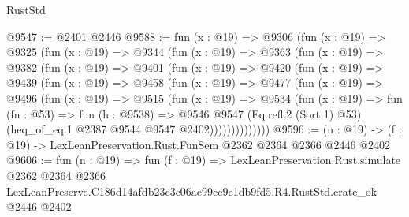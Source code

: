 \begin{lexlean}{RustStd}
\begin{coremodule}
@9547 := @2401 @2446
@9588 := fun (x : @19) =>
  @9306
    (fun (x : @19) =>
    @9325
      (fun (x : @19) =>
      @9344
        (fun (x : @19) =>
        @9363
          (fun (x : @19) =>
          @9382
            (fun (x : @19) =>
            @9401
              (fun (x : @19) =>
              @9420
                (fun (x : @19) =>
                @9439
                  (fun (x : @19) =>
                  @9458
                    (fun (x : @19) =>
                    @9477
                      (fun (x : @19) =>
                      @9496
                        (fun (x : @19) =>
                        @9515
                          (fun (x : @19) =>
                          @9534
                            (fun (x : @19) =>
                            fun (fn : @53) =>
                            fun (h : @9538) =>
                            @9546
                              @9547
                              (Eq.refl.{2} (Sort 1) @53)
                              (heq_of_eq.{1} @2387 @9544 @9547 @2402))))))))))))))
@9596 := (n : @19) -> (f : @19) -> LexLeanPreservation.Rust.FunSem @2362 @2364 @2366 @2446 @2402
@9606 := fun (n : @19) =>
  fun (f : @19) =>
  LexLeanPreservation.Rust.simulate
    @2362
    @2364
    @2366
    LexLeanPreserve.C186d14afdb23c3c06ac99ce9e1db9fd5.R4.RustStd.crate_ok
    @2446
    @2402
\end{coremodule}
\end{lexlean}
